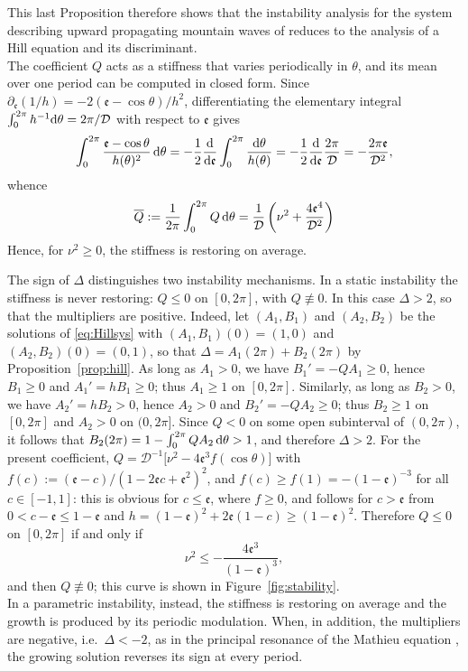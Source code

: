\documentclass[reqno]{amsart}
\newcommand{\D}{\mathcal{D}}
\newcommand{\ee}{\mathfrak{e}}
\begin{document}
\noindent
This last Proposition therefore shows that the instability analysis for the system describing upward propagating mountain waves of \cite{ConstantinMountain2023} reduces to the analysis of a Hill equation and its discriminant.\\
The coefficient $Q$ acts as a stiffness that varies periodically in $\theta$, and its mean over one period can be computed in closed form. Since $\partial_\ee(1/h)=-2(\ee-\cos\theta)/h^2$, differentiating the elementary integral $\int_0^{2\pi}h^{-1}{\rm d}\theta=2\pi/\D$ with respect to $\ee$ gives
\[
\int_0^{2\pi}\frac{\ee-\cos\theta}{h(\theta)^{2}}\,{\rm d}\theta
=-\frac12\frac{\rm d}{{\rm d}\ee}\int_0^{2\pi}\frac{{\rm d}\theta}{h(\theta)}
=-\frac12\frac{\rm d}{{\rm d}\ee}\frac{2\pi}{\D}
=-\frac{2\pi\ee}{\D^{2}},
\]
whence
\begin{equation}\label{eq:Qmean}
\overline{Q}:=\frac{1}{2\pi}\int_0^{2\pi}Q\,{\rm d}\theta=\frac{1}{\D}\left(\nu^{2}+\frac{4\ee^{4}}{\D^{2}}\right)
\end{equation}
Hence, for $\nu^2\ge0$, the stiffness is restoring on average.

The sign of $\Delta$ distinguishes two instability mechanisms. In a static instability the stiffness is never restoring: $Q\le0$ on $[0,2\pi]$, with $Q\not\equiv0$. In this case $\Delta>2$, so that the multipliers are positive. Indeed, let $(A_1,B_1)$ and $(A_2,B_2)$ be the solutions of \eqref{eq:Hillsys} with $(A_1,B_1)(0)=(1,0)$ and $(A_2,B_2)(0)=(0,1)$, so that $\Delta=A_1(2\pi)+B_2(2\pi)$ by Proposition~\ref{prop:hill}. As long as $A_1>0$, we have $B_1'=-QA_1\ge0$, hence $B_1\ge0$ and $A_1'=hB_1\ge0$; thus $A_1\ge1$ on $[0,2\pi]$. Similarly, as long as $B_2>0$, we have $A_2'=hB_2>0$, hence $A_2>0$ and $B_2'=-QA_2\ge0$; thus $B_2\ge1$ on $[0,2\pi]$ and $A_2>0$ on $(0,2\pi]$. Since $Q<0$ on some open subinterval of $(0,2\pi)$, it follows that $B_2(2\pi)=1-\int_0^{2\pi}QA_2\,{\rm d}\theta>1$, and therefore $\Delta>2$. For the present coefficient, $Q=\D^{-1}\big[\nu^2-4\ee^3 f(\cos\theta)\big]$ with $f(c):=(\ee-c)/(1-2\ee c+\ee^2)^2$, and $f(c)\ge f(1)=-(1-\ee)^{-3}$ for all $c\in[-1,1]$: this is obvious for $c\le\ee$, where $f\ge0$, and follows for $c>\ee$ from $0<c-\ee\le1-\ee$ and $h=(1-\ee)^2+2\ee(1-c)\ge(1-\ee)^2$. Therefore $Q\le0$ on $[0,2\pi]$ if and only if
\[
\nu^2\le-\frac{4\ee^3}{(1-\ee)^3},
\]
and then $Q\not\equiv0$; this curve is shown in Figure~\ref{fig:stability}.\\
In a {parametric} instability, instead, the stiffness is restoring on average and the growth is produced by its periodic modulation. When, in addition, the multipliers are negative, i.e.\ $\Delta<-2$, as in the principal resonance of the Mathieu equation \cite{MagnusWinkler,McLachlan}, the growing solution reverses its sign at every period.
\end{document}
